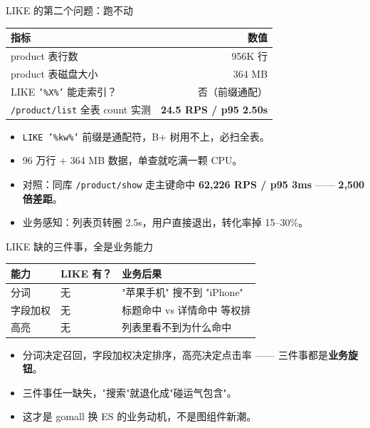 \documentclass[aspectratio=169,11pt]{beamer}
\begin{document}
\begin{frame}[shrink]{LIKE 的第二个问题：跑不动}
\begin{tabular}{@{}lr@{}}
\toprule
指标                       & 数值     \\
\midrule
product 表行数              & 956K 行  \\
product 表磁盘大小          & 364 MB   \\
LIKE \texttt{'\%X\%'} 能走索引？ & 否（前缀通配） \\
\texttt{/product/list} 全表 count 实测 & \textbf{24.5 RPS / p95 2.50s} \\
\bottomrule
\end{tabular}
\vspace{3mm}
\begin{itemize}
  \item \texttt{LIKE '\%kw\%'} 前缀是通配符，B+ 树用不上，必扫全表。
  \item 96 万行 + 364 MB 数据，单查就吃满一颗 CPU。
  \item 对照：同库 \texttt{/product/show} 走主键命中 \textbf{62{,}226 RPS / p95 3ms} —— \textbf{2{,}500 倍差距}。
  \item 业务感知：列表页转圈 2.5s，用户直接退出，转化率掉 15--30\%。
\end{itemize}
\end{frame}

\begin{frame}[shrink]{LIKE 缺的三件事，全是业务能力}
\begin{tabular}{@{}lll@{}}
\toprule
能力       & LIKE 有？ & 业务后果                          \\
\midrule
分词       & 无        & "苹果手机" 搜不到 "iPhone"        \\
字段加权    & 无        & 标题命中 vs 详情命中 等权排       \\
高亮       & 无        & 列表里看不到为什么命中            \\
\bottomrule
\end{tabular}
\vspace{2mm}
\begin{itemize}
  \item 分词决定召回，字段加权决定排序，高亮决定点击率 —— 三件事都是\textbf{业务旋钮}。
  \item 三件事任一缺失，"搜索"就退化成"碰运气包含"。
  \item 这才是 gomall 换 ES 的业务动机，不是图组件新潮。
\end{itemize}
\end{frame}
\end{document}
